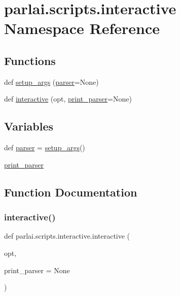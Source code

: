 \hypertarget{namespaceparlai_1_1scripts_1_1interactive}{}\section{parlai.\+scripts.\+interactive Namespace Reference}
\label{namespaceparlai_1_1scripts_1_1interactive}
\subsection*{Functions}
\begin{DoxyCompactItemize}
\item 
def \hyperlink{namespaceparlai_1_1scripts_1_1interactive_a873c4ae402aee061884a22139a5a442f}{setup\+\_\+args} (\hyperlink{namespaceparlai_1_1scripts_1_1interactive_af631be047dd505af8c9365e15ed26c16}{parser}=None)
\item 
def \hyperlink{namespaceparlai_1_1scripts_1_1interactive_aae322ec752aa32b1304870833db25f13}{interactive} (opt, \hyperlink{namespaceparlai_1_1scripts_1_1interactive_a680885c6952e73c13d84a76689b5822d}{print\+\_\+parser}=None)
\end{DoxyCompactItemize}
\subsection*{Variables}
\begin{DoxyCompactItemize}
\item 
def \hyperlink{namespaceparlai_1_1scripts_1_1interactive_af631be047dd505af8c9365e15ed26c16}{parser} = \hyperlink{namespaceparlai_1_1scripts_1_1interactive_a873c4ae402aee061884a22139a5a442f}{setup\+\_\+args}()
\item 
\hyperlink{namespaceparlai_1_1scripts_1_1interactive_a680885c6952e73c13d84a76689b5822d}{print\+\_\+parser}
\end{DoxyCompactItemize}


\subsection{Function Documentation}
\mbox{\label{namespaceparlai_1_1scripts_1_1interactive_aae322ec752aa32b1304870833db25f13}} 
\subsubsection{\texorpdfstring{interactive()}{interactive()}}
{\footnotesize\ttfamily def parlai.\+scripts.\+interactive.\+interactive (\begin{DoxyParamCaption}\item[{}]{opt,  }\item[{}]{print\+\_\+parser = {\ttfamily None} }\end{DoxyParamCaption})}



